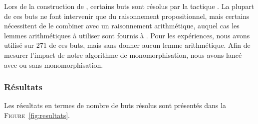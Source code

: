 Lors de la construction de \holfour, certains buts sont résolus par la
tactique \metistac. La plupart de ces buts ne font intervenir que du
raisonnement propositionnel, mais certains nécessitent de le combiner
avec un raisonnement arithmétique, auquel cas les lemmes arithmétiques à
utiliser sont fournis à \metistac. Pour les expériences, nous avons
utilisé \beagletac sur $271$ de ces buts, mais sans donner aucun lemme
arithmétique. Afin de mesurer l'impact de notre algorithme de
monomorphisation, nous avons lancé \beagletac avec ou sans
monomorphisation.

\subsubsection{Résultats}

Les résultats en termes de nombre de buts résolus sont présentés dans la
\textsc{Figure}~\ref{fig:resultats}.



